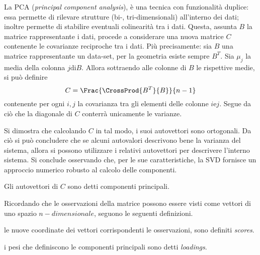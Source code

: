 \documentclass{subfiles}
\begin{document}
La PCA (\emph{principal component analysis}), è una tecnica con funzionalità duplice:
essa permette di rilevare strutture (bi-, tri-dimensionali) all'interno dei dati; inoltre permette di stabilire eventuali colinearità tra i dati.
Questa, assunta \(B\) la matrice rappresentante i dati, procede a considerare una nuova matrice \(C\) contenente le covarianze reciproche tra i dati.
Più precisamente: sia \(B\) una matrice rappresentante un data-set, per la geometria esiste sempre \(B^{T}\).
Sia \(\mu_{j}\) la media della colonna \(j \text{di} B\). Allora sottraendo alle colonne di \(B\) le rispettive medie,
si può definire
\[
    C = \Frac{\CrossProd{B^{T}}{B}}{n - 1}
\]
contenente per ogni \(i, j\) la covarianza tra gli elementi delle colonne \(i \text{e} j\).
Segue da ciò che la diagonale di \(C\) conterrà unicamente le varianze.

Si dimostra che calcolando \(C\) in tal modo, i suoi autovettori sono ortogonali.
Da ciò si può concludere che se alcuni autovalori descrivono bene la varianza del sistema,
allora si possono utilizzare i relativi autovettori per descrivere l'interno sistema.
Si conclude osservando che, per le sue caratteristiche, la SVD fornisce un approccio numerico robusto al calcolo delle componenti.
\begin{MarginNote}
    Gli autovettori di \(C\) sono detti componenti principali.
\end{MarginNote}

Ricordando che le osservazioni della matrice possono essere visti come vettori di uno spazio $n-dimensionale$, seguono le seguenti definizioni.
\begin{Definition*}
    le nuove coordinate dei vettori corrispondenti le osservazioni, sono definiti \emph{scores}.
\end{Definition*}
\begin{Definition*}
    i pesi che definiscono le componenti principali sono detti \emph{loadings}.
\end{Definition*}
\end{document}
